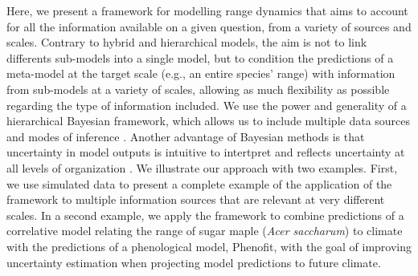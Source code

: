 Here, we present a framework for modelling range dynamics that aims to account for all the information available on a given question, from a variety of sources and scales.
Contrary to hybrid and hierarchical models, the aim is not to link differents sub-models into a single model, but to condition the predictions of a meta-model at the target scale (e.g., an entire species' range) with information from sub-models at a variety of scales, allowing as much flexibility as possible regarding the type of information included. 
We use the power and generality of a hierarchical Bayesian framework, which allows us to include multiple data sources and modes of inference \citep{Clark2005, VanOijen2005, Clark2006, Hobbs2011, Hartig2012}. 
Another advantage of Bayesian methods is that uncertainty in model outputs is intuitive to intertpret and reflects uncertainty at all levels of organization \citep{Clark2005, Cressie2009, Hobbs2011}. 
We illustrate our approach with two examples.
First, we use simulated data to present a complete example of the application of the framework to multiple information sources that are relevant at very different scales.
In a second example, we apply the framework to combine predictions of a correlative model relating the range of sugar maple (\emph{Acer saccharum}) to climate with the predictions of a phenological model, Phenofit, with the goal of improving uncertainty estimation when projecting model predictions to future climate.
